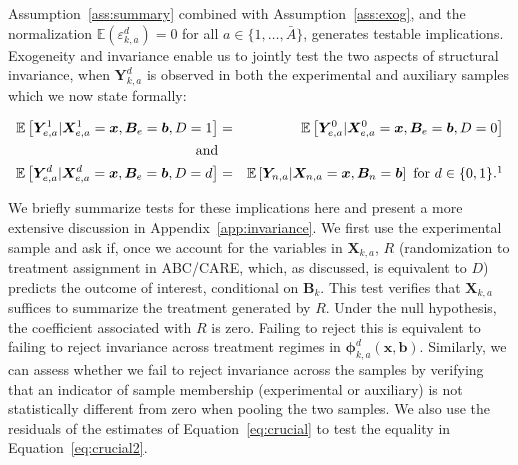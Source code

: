 Assumption~\ref{ass:summary} combined with Assumption~\ref{ass:exog}, and the normalization $\mathbb{E}(\varepsilon^d_{k,a})=0$ for all $a \in \{1,\dots,\bar{A}\}$, generates testable implications. Exogeneity and invariance enable us to jointly test the two aspects of structural invariance, when $\bm{Y}^d_{k,a}$ is observed in both the experimental and auxiliary samples which we now state formally:

\begin{eqnarray}
\mathbb{E} \left[ \bm{Y}_{e,a}^1 | \bm{X}_{e,a}^1 = \bm{x}, \bm{B}_{e} = \bm{b}, D = 1   \right] &=&  \mathbb{E} \left[ \bm{Y}_{e,a}^0 | \bm{X}_{e,a}^0 = \bm{x}, \bm{B}_{e} = \bm{b}, D = 0   \right] \label{eq:suff1}  \\
\text{ and} & \nonumber \\
\mathbb{E} \left[ \bm{Y}_{e,a}^d | \bm{X}_{e,a}^d = \bm{x}, \bm{B}_{e} = \bm{b}, D = d   \right] &=&  \mathbb{E} \left[ \bm{Y}_{n,a} | \bm{X}_{n,a} = \bm{x}, \bm{B}_{n} = \bm{b} \right] \text{ for }  d \in \{0,1\}. \label{eq:suff2}\footnotemark
\end{eqnarray}

We briefly summarize tests for these implications here and present a more extensive discussion in Appendix~\ref{app:invariance}. We first use the experimental sample and ask if, once we account for the variables in $\bm{X}_{k,a}$, $R$ (randomization to treatment assignment in ABC/CARE, which, as discussed, is equivalent to $D$) predicts the outcome of interest, conditional on $\bm{B}_k$. This test verifies that $\bm{X}_{k,a}$ suffices to summarize the treatment generated by $R$. Under the null hypothesis, the coefficient associated with $R$ is zero. Failing to reject this is equivalent to failing to reject invariance across treatment regimes in $\bm{\phi}_{k,a}^d \left( \bm{x}, \bm{b} \right)$. Similarly, we can assess whether we fail to reject invariance across the samples by verifying that an indicator of sample membership (experimental or auxiliary) is not statistically different from zero when pooling the two samples. We also use the residuals of the estimates of Equation~\eqref{eq:crucial} to test the equality in Equation~\eqref{eq:crucial2}.

